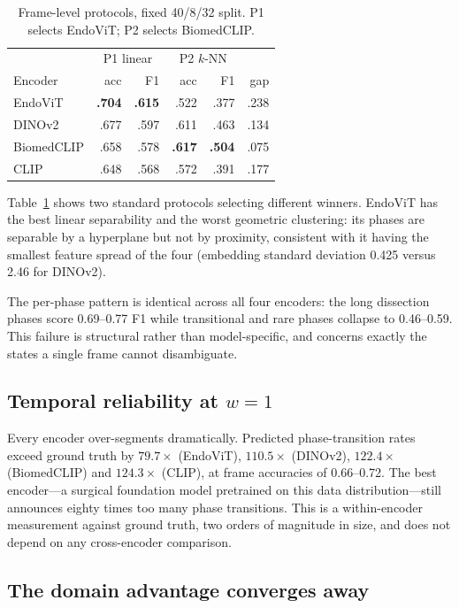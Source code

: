 \documentclass[10pt,twocolumn]{article}
\begin{document}
\begin{table}[t]\centering\small
\caption{Frame-level protocols, fixed 40/8/32 split. P1 selects EndoViT;
P2 selects BiomedCLIP.}
\label{tab:frame}
\begin{tabular}{@{}lrrrrr@{}}
\toprule
& \multicolumn{2}{c}{P1 linear} & \multicolumn{2}{c}{P2 $k$-NN} & \\
Encoder & acc & F1 & acc & F1 & gap \\
\midrule
EndoViT    & \bf.704 & \bf.615 & .522 & .377 & .238 \\
DINOv2     & .677 & .597 & .611 & .463 & .134 \\
BiomedCLIP & .658 & .578 & \bf.617 & \bf.504 & .075 \\
CLIP       & .648 & .568 & .572 & .391 & .177 \\
\bottomrule
\end{tabular}
\end{table}

Table~\ref{tab:frame} shows two standard protocols selecting different winners.
EndoViT has the best linear separability and the worst geometric clustering: its
phases are separable by a hyperplane but not by proximity, consistent with it
having the smallest feature spread of the four (embedding standard deviation
0.425 versus 2.46 for DINOv2).

The per-phase pattern is identical across all four encoders: the long
dissection phases score 0.69--0.77 F1 while transitional and rare phases
collapse to 0.46--0.59. This failure is structural rather than model-specific,
and concerns exactly the states a single frame cannot disambiguate.

\subsection{Temporal reliability at $w=1$}
\label{sec:temporal}
Every encoder over-segments dramatically. Predicted phase-transition rates
exceed ground truth by $79.7\times$ (EndoViT), $110.5\times$ (DINOv2),
$122.4\times$ (BiomedCLIP) and $124.3\times$ (CLIP), at frame accuracies of
0.66--0.72. The best encoder---a surgical foundation model pretrained on this
data distribution---still announces eighty times too many phase transitions.
This is a within-encoder measurement against ground truth, two orders of
magnitude in size, and does not depend on any cross-encoder comparison.

\subsection{The domain advantage converges away}
\label{sec:converge}
\end{document}
